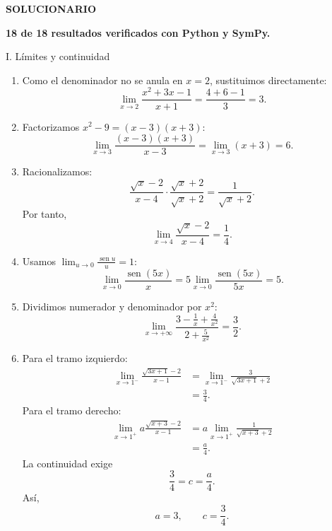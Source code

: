 \documentclass[letterpaper,12pt]{article}
\newcommand{\seno}{\operatorname{sen}}
\begin{document}
\clearpage
\begin{center}
    \begin{tcolorbox}[
        colback=azulFuerte,
        colframe=azulFuerte,
        colupper=white,
        width=0.8\textwidth,
        center,
        arc=10pt]
        \centering\Large\textbf{SOLUCIONARIO}
    \end{tcolorbox}
\end{center}

\begin{validacionbox}
\centering
\textbf{\color{verdeValidado}18 de 18 resultados verificados con Python y SymPy.}
\end{validacionbox}

\begin{solbox}{I. Límites y continuidad}
\begin{enumerate}[label=\color{azulFuerte}\textbf{\arabic*.},leftmargin=*,itemsep=1em]
    \item Como el denominador no se anula en \(x=2\), sustituimos directamente:
    \[
    \lim_{x\to2}\frac{x^2+3x-1}{x+1}
    =\frac{4+6-1}{3}
    =\boxed{3}.
    \]

    \item Factorizamos \(x^2-9=(x-3)(x+3)\):
    \[
    \lim_{x\to3}\frac{(x-3)(x+3)}{x-3}
    =\lim_{x\to3}(x+3)
    =\boxed{6}.
    \]

    \item Racionalizamos:
    \[
    \frac{\sqrt{x}-2}{x-4}
    \cdot\frac{\sqrt{x}+2}{\sqrt{x}+2}
    =\frac{1}{\sqrt{x}+2}.
    \]
    Por tanto,
    \[
        \lim_{x\to4}\frac{\sqrt{x}-2}{x-4}
        =\boxed{\frac14}.
    \]

    \item Usamos \(\lim_{u\to0}\frac{\seno u}{u}=1\):
    \[
    \lim_{x\to0}\frac{\seno(5x)}{x}
    =5\lim_{x\to0}\frac{\seno(5x)}{5x}
    =\boxed{5}.
    \]

    \item Dividimos numerador y denominador por \(x^2\):
    \[
    \lim_{x\to+\infty}
    \frac{3-\frac1x+\frac4{x^2}}{2+\frac5{x^2}}
    =\boxed{\frac32}.
    \]

    \item Para el tramo izquierdo:
    \[
    \begin{aligned}
    \lim_{x\to1^-}\frac{\sqrt{3x+1}-2}{x-1}
    &=
    \lim_{x\to1^-}
    \frac{3}{\sqrt{3x+1}+2}\\
    &=\frac34.
    \end{aligned}
    \]
    Para el tramo derecho:
    \[
    \begin{aligned}
    \lim_{x\to1^+}
    a\frac{\sqrt{x+3}-2}{x-1}
    &=
    a\lim_{x\to1^+}
    \frac{1}{\sqrt{x+3}+2}\\
    &=\frac{a}{4}.
    \end{aligned}
    \]
    La continuidad exige
    \[
        \frac34=c=\frac{a}{4}.
    \]
    Así,
    \[
        \boxed{a=3,\qquad c=\frac34}.
    \]
\end{enumerate}
\end{solbox}
\end{document}
